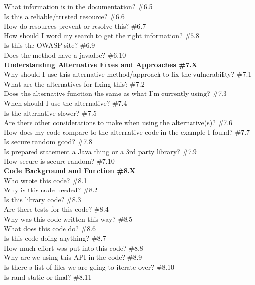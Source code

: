 \documentclass[10pt,journal,compsoc]{IEEEtran}
\begin{document}
	What information is in the documentation? \#6.5 \\
	Is this a reliable/trusted resource? \#6.6 \\
	How do resources prevent or resolve this? \#6.7 \\
	How should I word my search to get the right information? \#6.8 \\
	Is this the OWASP site? \#6.9 \\
	Does the method have a javadoc? \#6.10 \\
\textbf{Understanding Alternative Fixes and Approaches \#7.X} \\
	Why should I use this alternative method/approach to fix the vulnerability? \#7.1 \\
	What are the alternatives for fixing this? \#7.2 \\
	Does the alternative function the same as what I'm currently using? \#7.3 \\
	When should I use the alternative?  \#7.4 \\
	Is the alternative slower?  \#7.5 \\
	Are there other considerations to make when using the alternative(s)? \#7.6 \\
	How does my code compare to the alternative code in the example I found? \#7.7 \\
	Is secure random good?  \#7.8 \\
	Is prepared statement a Java thing or a 3rd party library?  \#7.9 \\
	How secure is secure random?  \#7.10 \\
\textbf{Code Background and Function \#8.X} \\
	Who wrote this code? \#8.1 \\
	Why is this code needed? \#8.2  \\
	Is this library code? \#8.3 \\
	Are there tests for this code?  \#8.4 \\
	Why was this code written this way? \#8.5 \\
	What does this code do? \#8.6 \\
	Is this code doing anything? \#8.7 \\
	How much effort was put into this code? \#8.8 \\
	Why are we using this API in the code? \#8.9 \\
	Is there a list of files we are going to iterate over?  \#8.10 \\
	Is rand static or final?  \#8.11 \\
\end{document}
